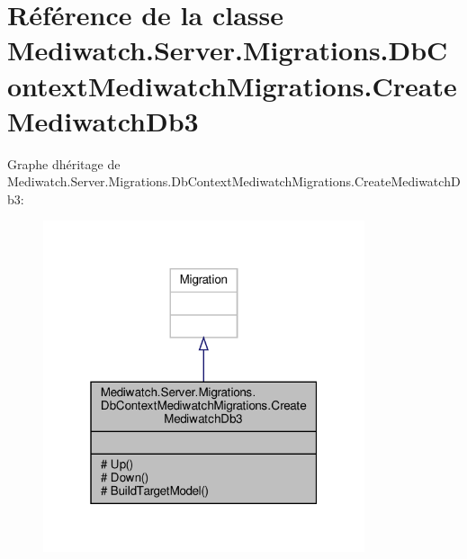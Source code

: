 \hypertarget{class_mediwatch_1_1_server_1_1_migrations_1_1_db_context_mediwatch_migrations_1_1_create_mediwatch_db3}{}\section{Référence de la classe Mediwatch.\+Server.\+Migrations.\+Db\+Context\+Mediwatch\+Migrations.\+Create\+Mediwatch\+Db3}
\label{class_mediwatch_1_1_server_1_1_migrations_1_1_db_context_mediwatch_migrations_1_1_create_mediwatch_db3}


Graphe d\textquotesingle{}héritage de Mediwatch.\+Server.\+Migrations.\+Db\+Context\+Mediwatch\+Migrations.\+Create\+Mediwatch\+Db3\+:
\nopagebreak
\begin{figure}[H]
\begin{center}
\leavevmode
\includegraphics[width=268pt]{class_mediwatch_1_1_server_1_1_migrations_1_1_db_context_mediwatch_migrations_1_1_create_mediwatch_db3__inherit__graph}
\end{center}
\end{figure}


